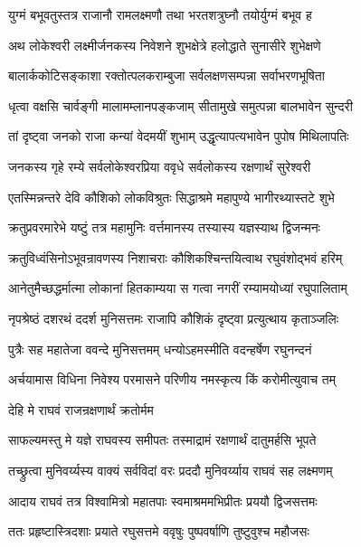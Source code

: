 \twolineshloka
{युग्मं बभूवतुस्तत्र राजानौ रामलक्ष्मणौ}
{तथा भरतशत्रुघ्नौ तयोर्युग्मं बभूव ह}%

\twolineshloka
{अथ लोकेश्वरी लक्ष्मीर्जनकस्य निवेशने}
{शुभक्षेत्रे हलोद्धाते सुनासीरे शुभेक्षणे}%

\twolineshloka
{बालार्ककोटिसङ्काशा रक्तोत्पलकराम्बुजा}
{सर्वलक्षणसम्पन्ना सर्वाभरणभूषिता}%

\twolineshloka
{धृत्वा वक्षसि चार्वङ्गी मालामम्लानपङ्कजाम्}
{सीतामुखे समुत्पन्ना बालभावेन सुन्दरी}%

\twolineshloka
{तां दृष्ट्वा जनको राजा कन्यां वेदमयीं शुभाम्}
{उद्धृत्यापत्यभावेन पुपोष मिथिलापतिः}%

\twolineshloka
{जनकस्य गृहे रम्ये सर्वलोकेश्वरप्रिया}
{ववृधे सर्वलोकस्य रक्षणार्थं सुरेश्वरी}%

\twolineshloka
{एतस्मिन्नन्तरे देवि कौशिको लोकविश्रुतः}
{सिद्धाश्रमे महापुण्ये भागीरथ्यास्तटे शुभे}%

\twolineshloka
{क्रतुप्रवरमारेभे यष्टुं तत्र महामुनिः}
{वर्त्तमानस्य तस्यास्य यज्ञस्याथ द्विजन्मनः}%

\twolineshloka
{क्रतुविध्वंसिनोऽभूवन्रावणस्य निशाचराः}
{कौशिकश्चिन्तयित्वाथ रघुवंशोद्भवं हरिम्}%

\twolineshloka
{आनेतुमैच्छद्धर्मात्मा लोकानां हितकाम्यया}
{स गत्वा नगरीं रम्यामयोध्यां रघुपालिताम्}%

\twolineshloka
{नृपश्रेष्ठं दशरथं ददर्श मुनिसत्तमः}
{राजापि कौशिकं दृष्ट्वा प्रत्युत्थाय कृताञ्जलिः}%

\twolineshloka
{पुत्रैः सह महातेजा ववन्दे मुनिसत्तमम्}
{धन्योऽहमस्मीति वदन्हर्षेण रघुनन्दनं}%

\twolineshloka
{अर्चयामास विधिना निवेश्य परमासने}
{परिणीय नमस्कृत्य किं करोमीत्युवाच तम्}%


\onelineshloka
{देहि मे राघवं राजन्रक्षणार्थं क्रतोर्मम}%

\twolineshloka
{साफल्यमस्तु मे यज्ञे राघवस्य समीपतः}
{तस्माद्रामं रक्षणार्थं दातुमर्हसि भूपते}%


\twolineshloka
{तच्छ्रुत्वा मुनिवर्य्यस्य वाक्यं सर्वविदां वरः}
{प्रददौ मुनिवर्य्याय राघवं सह लक्ष्मणम्}%

\twolineshloka
{आदाय राघवं तत्र विश्वामित्रो महातपाः}
{स्वमाश्रममभिप्रीतः प्रययौ द्विजसत्तमः}%

\twolineshloka
{ततः प्रहृष्टास्त्रिदशाः प्रयाते रघुसत्तमे}
{ववृषुः पुष्पवर्षाणि तुष्टुवुश्च महौजसः}%

